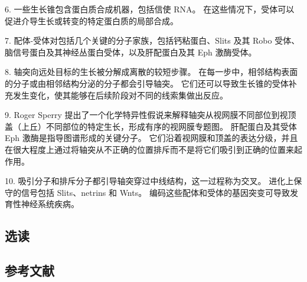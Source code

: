 6. 一些生长锥包含蛋白质合成机器，包括信使 RNA。 在这些情况下，受体可以促进介导生长或转变的特定蛋白质的局部合成。 

7. 配体-受体对包括几个关键的分子家族，包括钙粘蛋白、Slits 及其 Robo 受体、脑信号蛋白及其神经丛蛋白受体，以及肝配蛋白及其 Eph 激酶受体。 

8. 轴突向远处目标的生长被分解成离散的较短步骤。 在每一步中，相邻结构表面的分子或由相邻结构分泌的分子都会引导轴突。 它们还可以导致生长锥的受体补充发生变化，使其能够在后续阶段对不同的线索集做出反应。 

9. Roger Sperry 提出了一个化学特异性假说来解释轴突从视网膜不同部位到视顶盖（上丘）不同部位的特定生长，形成有序的视网膜专题图。 肝配蛋白及其受体 Eph 激酶是指导图谱形成的关键分子。 它们沿着视网膜和顶盖的表达分级，并且在很大程度上通过将轴突从不正确的位置排斥而不是将它们吸引到正确的位置来起作用。 

10. 吸引分子和排斥分子都引导轴突穿过中线结构，这一过程称为交叉。 进化上保守的信号包括 Slits、netrins 和 Wnts。 编码这些配体和受体的基因突变可导致发育性神经系统疾病。

\subsection{选读}
\subsection{参考文献}
